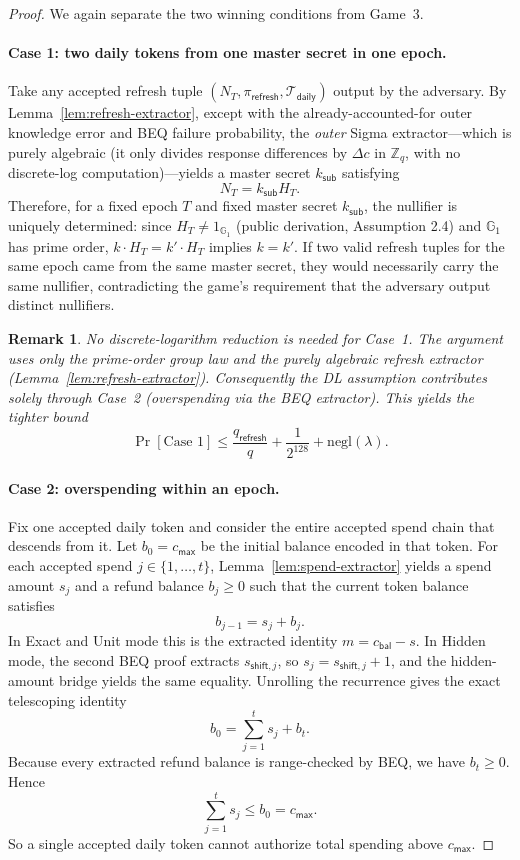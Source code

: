 \documentclass[11pt]{article}
\theoremstyle{definitionstyle}
\theoremstyle{plain}
\newtheorem*{remark}{Remark}
\newcommand{\negl}{\mathrm{negl}}
\begin{document}
\begin{proof}
We again separate the two winning conditions from Game~3.

\paragraph{Case 1: two daily tokens from one master secret in one epoch.}
Take any accepted refresh tuple $(N_T,\pi_{\mathsf{refresh}},\mathcal{T}_{\mathsf{daily}})$ output by the adversary. By Lemma~\ref{lem:refresh-extractor}, except with the already-accounted-for outer knowledge error and BEQ failure probability, the \emph{outer} Sigma extractor—which is purely algebraic (it only divides response differences by $\Delta c$ in $\mathbb{Z}_q$, with no discrete-log computation)—yields a master secret $k_{\mathsf{sub}}$ satisfying
\[
N_T = k_{\mathsf{sub}} H_T.
\]
Therefore, for a fixed epoch $T$ and fixed master secret $k_{\mathsf{sub}}$, the nullifier is uniquely determined: since $H_T \ne 1_{\mathbb{G}_1}$ (public derivation, Assumption 2.4) and $\mathbb{G}_1$ has prime order, $k \cdot H_T = k' \cdot H_T$ implies $k = k'$. If two valid refresh tuples for the same epoch came from the same master secret, they would necessarily carry the same nullifier, contradicting the game's requirement that the adversary output distinct nullifiers.

\begin{remark}
No discrete-logarithm reduction is needed for Case~1.  The argument uses only the prime-order group law and the purely algebraic refresh extractor (Lemma~\ref{lem:refresh-extractor}).  Consequently the DL assumption contributes \emph{solely} through Case~2 (overspending via the BEQ extractor).  This yields the tighter bound
\[
\Pr[\text{Case 1}] \le \frac{q_{\mathsf{refresh}}}{q} + \frac{1}{2^{128}} + \negl(\lambda).
\]
\end{remark}

\paragraph{Case 2: overspending within an epoch.}
Fix one accepted daily token and consider the entire accepted spend chain that descends from it. Let $b_0=c_{\mathsf{max}}$ be the initial balance encoded in that token. For each accepted spend $j \in \{1,\dots,t\}$, Lemma~\ref{lem:spend-extractor} yields a spend amount $s_j$ and a refund balance $b_j \ge 0$ such that the current token balance satisfies
\[
b_{j-1} = s_j + b_j.
\]
In Exact and Unit mode this is the extracted identity $m=c_{\mathsf{bal}}-s$. In Hidden mode, the second BEQ proof extracts $s_{\mathsf{shift},j}$, so $s_j=s_{\mathsf{shift},j}+1$, and the hidden-amount bridge yields the same equality. Unrolling the recurrence gives the exact telescoping identity
\[
b_0 = \sum_{j=1}^{t} s_j + b_t.
\]
Because every extracted refund balance is range-checked by BEQ, we have $b_t \ge 0$. Hence
\[
\sum_{j=1}^{t} s_j \le b_0 = c_{\mathsf{max}}.
\]
So a single accepted daily token cannot authorize total spending above $c_{\mathsf{max}}$.


\end{proof}
\end{document}
